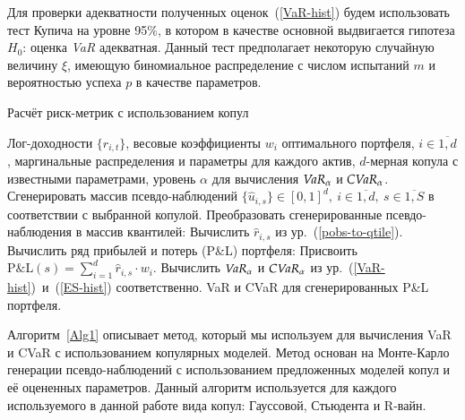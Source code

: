 Для проверки адекватности полученных оценок~(\ref{VaR-hist}) будем использовать тест Купича \cite{Kupiec95, Travkin2013} на уровне 95\%, в котором в качестве основной выдвигается гипотеза $H_0$: оценка \emph{VaR} адекватная. 
Данный тест предполагает некоторую случайную величину $\xi$, имеющую биномиальное распределение с числом испытаний $m$ и вероятностью успеха $p$ в качестве параметров.


\begin{algorithm}[t]
\caption{Расчёт риск-метрик с использованием копул}
\label{Alg1}
\begin{algorithmic}[1]
	\Require Лог-доходности $\{r_{i,t}\}$, весовые коэффициенты $w_i$ оптимального портфеля, $i \in \overline{1,d}$, маргинальные распределения и параметры для каждого актив, $d$-мерная копула с известными параметрами, уровень $\alpha$ для вычисления $\emph{VaR}_\alpha$ и $\emph{CVaR}_\alpha$.
	\label{Alg1:input}
	\State Сгенерировать массив псевдо-наблюдений 
	$\{\hat{u}_{i,s}\} \in [0, 1]^d, \ i \in \overline{1,d}, \ s \in \overline{1, S}$ 
	в соответствии с выбранной копулой.\label{Alg1:simulation}
	\State Преобразовать сгенерированные псевдо-наблюдения в массив квантилей:
	\label{Alg1:transform:start}
	        \State Вычислить $\hat{r}_{i,s}$ из ур.~(\ref{pobs-to-qtile}). \label{Alg1:transform}
	    \EndFor
	\EndFor \label{Alg1:transform:end}
	\State Вычислить ряд прибылей и потерь (P\&L) портфеля:
	\State Присвоить $\text{P\&L}(s) = \sum_{i=1}^d \hat{r}_{i,s} \cdot w_i$. \label{Alg1:PnL}
	\EndFor
	\State Вычислить $\emph{VaR}_\alpha$ и $\emph{CVaR}_\alpha$ из ур.~(\ref{VaR-hist})~и~(\ref{ES-hist}) соответственно. \label{Alg1:risk-measures}
	\Ensure VaR и CVaR для сгенерированных P\&L портфеля.
\end{algorithmic}
\end{algorithm}

Алгоритм~\ref{Alg1} описывает метод, который мы используем для вычисления VaR и CVaR с использованием копулярных моделей.
Метод основан на Монте-Карло генерации псевдо-наблюдений с использованием предложенных моделей копул и её оцененных параметров.
Данный алгоритм используется для каждого используемого в данной работе вида копул: Гауссовой, Стьюдента и R-вайн.

